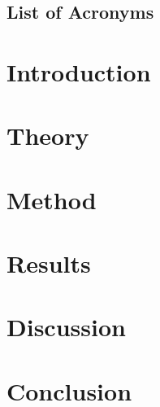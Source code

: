 \documentclass[a4paper,twoside,11pt]{report} %
\begin{document}

\pagecolor{white}
\pagestyle{empty}
\todototoc
\listoftodos
\cleardoublepage 

\clearpage 
\pagestyle{main}

\clearpage 

%
\cleardoublepage 
\tableofcontents
\cleardoublepage 

\section*{List of Acronyms}


\cleardoublepage
\acresetall
\chapter{Introduction}

\cleardoublepage
\chapter{Theory}

\cleardoublepage
\chapter{Method}
\label{sec:method}

\cleardoublepage
\chapter{Results}
\label{sec:results}

\cleardoublepage
\chapter{Discussion}
\label{sec:discussion}

\cleardoublepage
\chapter{Conclusion}
\label{sec:conclusion}


\printbibliography[heading=bibintoc,title={Bibliography}]
\cleardoublepage 
\appendix

\cleartoleftpage

\end{document}
